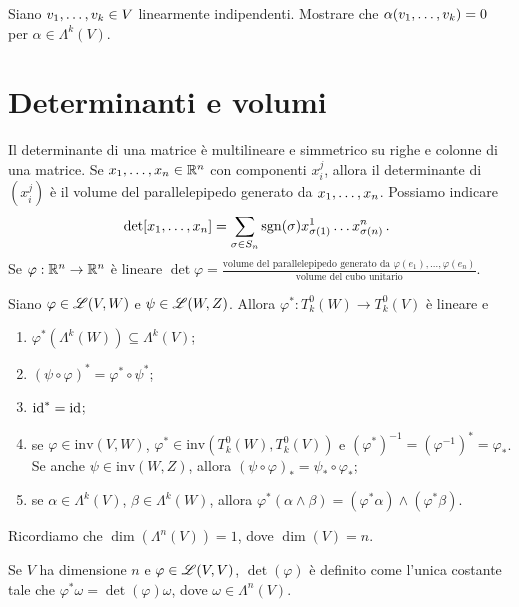 \begin{exercise}
	Siano $\seqb vk, \in V$ linearmente indipendenti. Mostrare che $\alpha(\seqb vk,) = 0$ per $\alpha\in\Lambda^k(V)$. 
\end{exercise}


\section{Determinanti e volumi}

Il determinante di una matrice è multilineare e simmetrico su righe e colonne di una matrice.
Se $\seqb xn, \in\R^n$ con componenti $x_i^j$, allora il determinante di $(x_i^j)$ è il volume del parallelepipedo generato da $\seqb xn,$.
Possiamo indicare
\begin{equation*}
	\det[\seqb xn,] = \sum_{\sigma\in S_n} \sgn(\sigma) x_{\sigma(1)}^1\ldots x_{\sigma(n)}^n \punto
\end{equation*}
Se $\varphi:\R^n\to\R^n$ è lineare $\det\varphi = \frac{\text{volume del parallelepipedo generato da $\varphi(e_1),\ldots,\varphi(e_n)$}}{\text{volume del cubo unitario}}$.

\begin{proposition}
	Siano $\varphi\in\Lin(V,W)$ e $\psi\in\Lin(W,Z)$. Allora $\varphi^* : T^0_k(W) \to T^0_k(V)$ è lineare e 
	\begin{enumerate}
		\item $\varphi^*(\Lambda^k(W)) \subseteq \Lambda^k(V)$;
		\item $(\psi\circ\varphi)^* = \varphi^* \circ \psi^*$;
		\item $\id^* = \id$;
		\item se $\varphi\in \mathrm{inv}(V,W)$, $\varphi^*\in \mathrm{inv}(T^0_k(W), T^0_k(V))$ e $(\varphi^*)^{-1} = (\varphi^{-1})^* = \varphi_*$.
		Se anche $\psi\in\mathrm{inv}(W,Z)$, allora $(\psi\circ\varphi)_* = \psi_*\circ \varphi_*$; %
		\item se $\alpha\in\Lambda^k(V)$, $\beta\in\Lambda^k(W)$, allora $\varphi^*(\alpha\wedge\beta) = (\varphi^*\alpha) \wedge (\varphi^*\beta)$.
	\end{enumerate}
\end{proposition}

Ricordiamo che $\dim(\Lambda^n(V)) = 1$, dove $\dim(V)=n$.
\begin{definition}
	Se $V$ ha dimensione $n$ e $\varphi\in\Lin(V,V)$, $\det(\varphi)$ è definito come l'unica costante tale che $\varphi^*\omega = \det(\varphi) \omega$, dove $\omega\in\Lambda^n(V)$.
\end{definition}

